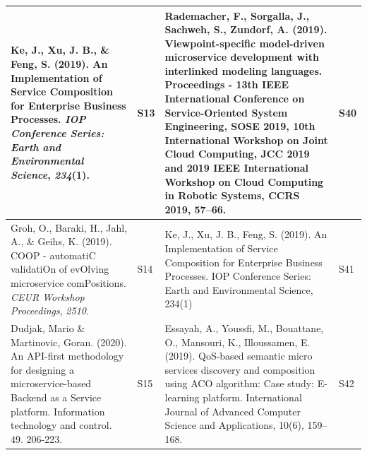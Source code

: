 \documentclass{article}
\begin{document}
\begin{appendices}
\begin{table}
\begin{center}
\scriptsize
\begin{tabular}{ | m{20em} | m{1cm}| m{20em} | m{1cm} | }
\hline
Ke, J., Xu, J. B., \& Feng, S. (2019). An Implementation of Service Composition for Enterprise Business Processes. \textit{IOP Conference Series: Earth and Environmental Science}, \textit{234}(1).~                                                                                                                                                     & S13            & Rademacher, F., Sorgalla, J., Sachweh, S.,  Zundorf, A. (2019). Viewpoint-specific model-driven microservice development with interlinked modeling languages. Proceedings - 13th IEEE International Conference on Service-Oriented System Engineering, SOSE 2019, 10th International Workshop on Joint Cloud Computing, JCC 2019 and 2019 IEEE International Workshop on Cloud Computing in Robotic Systems, CCRS 2019, 57–66. & S40             \\ 
\hline
Groh, O., Baraki, H., Jahl, A., \& Geihs, K. (2019). COOP - automatiC validatiOn of evOlving microservice comPositions. \textit{CEUR Workshop Proceedings}, \textit{2510}.~                                                                                                                                                                               & S14            & Ke, J., Xu, J. B.,  Feng, S. (2019). An Implementation of Service Composition for Enterprise Business Processes. IOP Conference Series: Earth and Environmental Science, 234(1)                                                                                                                                                                                                                                                & S41             \\ 
\hline
\textcolor[rgb]{0.102,0.102,0.102}{Dudjak, Mario \& Martinovic, Goran. (2020). An API-first methodology for designing a microservice-based Backend as a Service platform. Information technology and control. 49. 206-223.}                                                                                                                               & S15            & Essayah, A., Youssfi, M., Bouattane, O., Mansouri, K.,  Illoussamen, E. (2019). QoS-based semantic micro services discovery and composition using ACO algorithm: Case study: E-learning platform. International Journal of Advanced Computer Science and Applications, 10(6), 159–168.                                                                                                                                         & S42             \\ 

\end{tabular}
\end{center}
\end{table}
\end{appendices}
\end{document}
